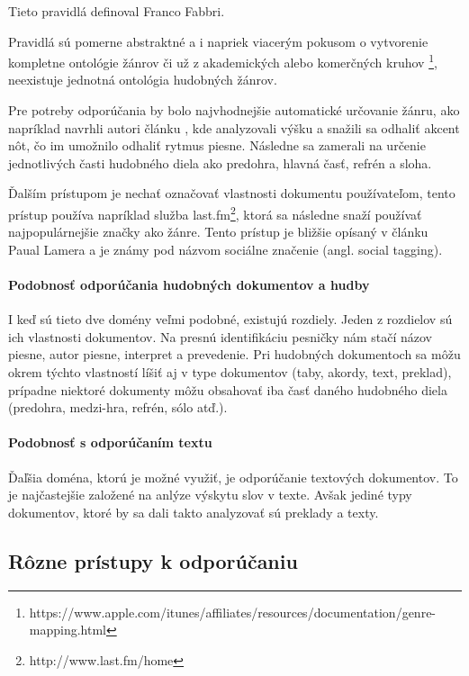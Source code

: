 Tieto pravidlá definoval Franco Fabbri\cite{music_genres_problematics}.

Pravidlá sú pomerne abstraktné a i napriek viacerým pokusom o vytvorenie
kompletne ontológie žánrov či už z akademických alebo komerčných kruhov
\footnote[2]{https://www.apple.com/itunes/affiliates/resources/documentation/genre-mapping.html},
neexistuje jednotná ontológia hudobných žánrov.

Pre potreby odporúčania by bolo najvhodnejšie automatické určovanie žánru, ako napríklad 
navrhli autori článku \cite{automatic_genre_recognition}, kde analyzovali výšku
a snažili sa odhaliť akcent nôt, čo im umožnilo odhaliť rytmus piesne. Následne sa zamerali
na určenie jednotlivých časti hudobného diela ako predohra, hlavná časť, refrén a sloha.

Ďalším prístupom je nechať označovať vlastnosti dokumentu používateľom, tento prístup
používa napríklad služba last.fm\footnote[3]{http://www.last.fm/home}, ktorá sa následne
snaží používať najpopulárnejšie značky ako žánre. Tento prístup je bližšie opísaný v článku 
Paual Lamera\cite{social_tagging_music} a je známy pod názvom sociálne značenie 
(angl. social tagging).

\paragraph{Podobnosť odporúčania hudobných dokumentov a hudby}

I keď sú tieto dve domény veľmi podobné, existujú rozdiely. Jeden z rozdielov sú ich vlastnosti 
dokumentov. Na presnú identifikáciu pesničky nám stačí názov piesne, autor piesne, interpret a 
prevedenie. Pri hudobných dokumentoch sa môžu okrem týchto vlastností líšiť aj v type dokumentov
(taby, akordy, text, preklad), prípadne niektoré dokumenty môžu obsahovať iba časť daného
hudobného diela (predohra, medzi-hra, refrén, sólo atď.).

\paragraph{Podobnosť s odporúčaním textu}

Ďaľšia doména, ktorú je možné využiť, je odporúčanie textových dokumentov. To je najčastejšie 
založené na anlýze výskytu slov v texte. Avšak jediné typy dokumentov, ktoré by sa 
dali takto analyzovať sú preklady a texty.

\subsection{Rôzne prístupy k odporúčaniu}

